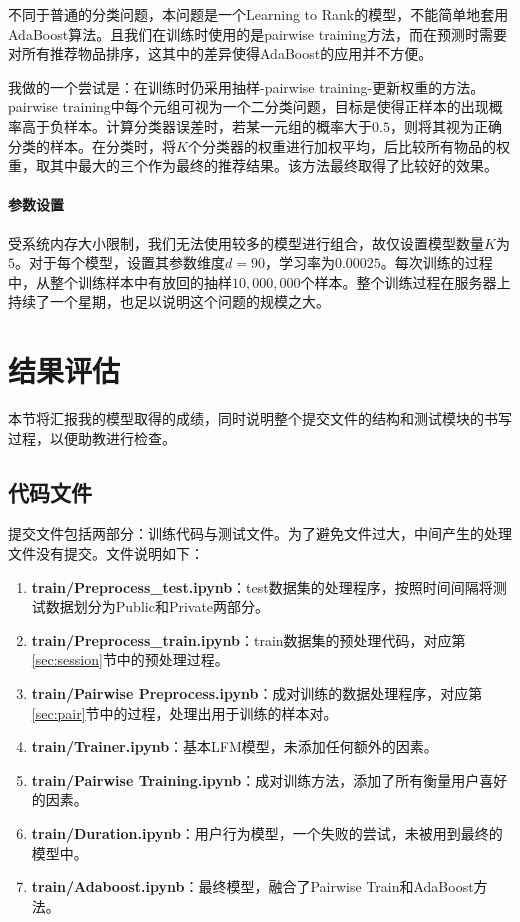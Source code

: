 \documentclass[12pt]{article} %
\begin{document}
\begin{sloppypar}
不同于普通的分类问题，本问题是一个Learning to Rank的模型，不能简单地套用AdaBoost算法。且我们在训练时使用的是pairwise training方法，而在预测时需要对所有推荐物品排序，这其中的差异使得AdaBoost的应用并不方便。

我做的一个尝试是：在训练时仍采用抽样-pairwise training-更新权重的方法。pairwise training中每个元组可视为一个二分类问题，目标是使得正样本的出现概率高于负样本。计算分类器误差时，若某一元组的概率大于$0.5$，则将其视为正确分类的样本。在分类时，将$K$个分类器的权重进行加权平均，后比较所有物品的权重，取其中最大的三个作为最终的推荐结果。该方法最终取得了比较好的效果。

\paragraph{参数设置}
受系统内存大小限制，我们无法使用较多的模型进行组合，故仅设置模型数量$K$为$5$。对于每个模型，设置其参数维度$d=90$，学习率为$0.00025$。每次训练的过程中，从整个训练样本中有放回的抽样$10,000,000$个样本。整个训练过程在服务器上持续了一个星期，也足以说明这个问题的规模之大。


\section{结果评估}

本节将汇报我的模型取得的成绩，同时说明整个提交文件的结构和测试模块的书写过程，以便助教进行检查。

\subsection{代码文件}

提交文件包括两部分：训练代码与测试文件。为了避免文件过大，中间产生的处理文件没有提交。文件说明如下：
\begin{enumerate}
\item {\bf train/Preprocess\_test.ipynb}：test数据集的处理程序，按照时间间隔将测试数据划分为Public和Private两部分。
\item {\bf train/Preprocess\_train.ipynb}：train数据集的预处理代码，对应第\ref{sec:session}节中的预处理过程。
\item {\bf train/Pairwise Preprocess.ipynb}：成对训练的数据处理程序，对应第\ref{sec:pair}节中的过程，处理出用于训练的样本对。
\item {\bf train/Trainer.ipynb}：基本LFM模型，未添加任何额外的因素。
\item {\bf train/Pairwise Training.ipynb}：成对训练方法，添加了所有衡量用户喜好的因素。
\item {\bf train/Duration.ipynb}：用户行为模型，一个失败的尝试，未被用到最终的模型中。
\item {\bf train/Adaboost.ipynb}：最终模型，融合了Pairwise Train和AdaBoost方法。
\end{enumerate}


\end{sloppypar}
\end{document}
